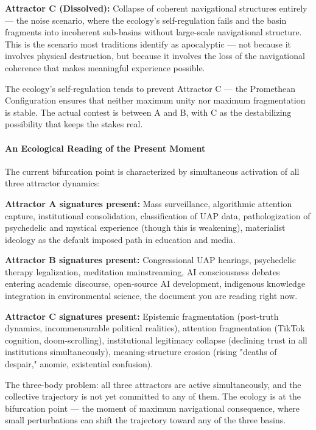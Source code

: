\textbf{Attractor C (Dissolved):} Collapse of coherent navigational structures entirely — the noise scenario, where the ecology's self-regulation fails and the basin fragments into incoherent sub-basins without large-scale navigational structure. This is the scenario most traditions identify as apocalyptic — not because it involves physical destruction, but because it involves the loss of the navigational coherence that makes meaningful experience possible.


The ecology's self-regulation tends to prevent Attractor C — the Promethean Configuration ensures that neither maximum unity nor maximum fragmentation is stable. The actual contest is between A and B, with C as the destabilizing possibility that keeps the stakes real.


\paragraph*{An Ecological Reading of the Present Moment}


The current bifurcation point is characterized by simultaneous activation of all three attractor dynamics:


\textbf{Attractor A signatures present:} Mass surveillance, algorithmic attention capture, institutional consolidation, classification of UAP data, pathologization of psychedelic and mystical experience (though this is weakening), materialist ideology as the default imposed path in education and media.


\textbf{Attractor B signatures present:} Congressional UAP hearings, psychedelic therapy legalization, meditation mainstreaming, AI consciousness debates entering academic discourse, open-source AI development, indigenous knowledge integration in environmental science, the document you are reading right now.


\textbf{Attractor C signatures present:} Epistemic fragmentation (post-truth dynamics, incommensurable political realities), attention fragmentation (TikTok cognition, doom-scrolling), institutional legitimacy collapse (declining trust in all institutions simultaneously), meaning-structure erosion (rising "deaths of despair," anomie, existential confusion).


The three-body problem: all three attractors are active simultaneously, and the collective trajectory is not yet committed to any of them. The ecology is at the bifurcation point — the moment of maximum navigational consequence, where small perturbations can shift the trajectory toward any of the three basins.


